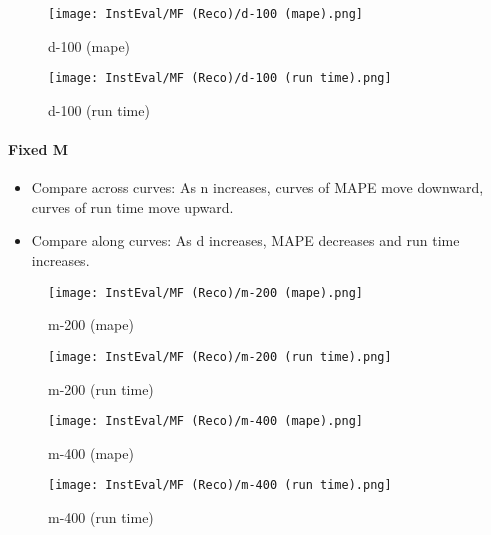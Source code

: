 \documentclass[12pt]{article}
\begin{document}
\begin{figure}[H]
\centering
    \begin{minipage}{0.45\textwidth}
        \centering
        \texttt{[image: InstEval/MF (Reco)/d-100 (mape).png]}
        \caption{d-100 (mape)}
        
    \end{minipage}\hfill
    \begin{minipage}{0.45\textwidth}
        \centering
        \texttt{[image: InstEval/MF (Reco)/d-100 (run time).png]}
        \caption{d-100 (run time)}
    \end{minipage}
\end{figure}

\paragraph{Fixed M}
\begin{itemize}
\item Compare across curves: As n increases, curves of MAPE move downward, curves of run time move upward.
\item Compare along curves: As d increases, MAPE decreases and run time increases. 
\end{itemize}

\begin{figure}[H]
\centering
    \begin{minipage}{0.45\textwidth}
        \centering
        \texttt{[image: InstEval/MF (Reco)/m-200 (mape).png]}
        \caption{m-200 (mape)}
        
    \end{minipage}\hfill
    \begin{minipage}{0.45\textwidth}
        \centering
        \texttt{[image: InstEval/MF (Reco)/m-200 (run time).png]}
        \caption{m-200 (run time)}
    \end{minipage}
\end{figure}

\begin{figure}[H]
\centering
    \begin{minipage}{0.45\textwidth}
        \centering
        \texttt{[image: InstEval/MF (Reco)/m-400 (mape).png]}
        \caption{m-400 (mape)}
        
    \end{minipage}\hfill
    \begin{minipage}{0.45\textwidth}
        \centering
        \texttt{[image: InstEval/MF (Reco)/m-400 (run time).png]}
        \caption{m-400 (run time)}
    \end{minipage}
\end{figure}
\end{document}
